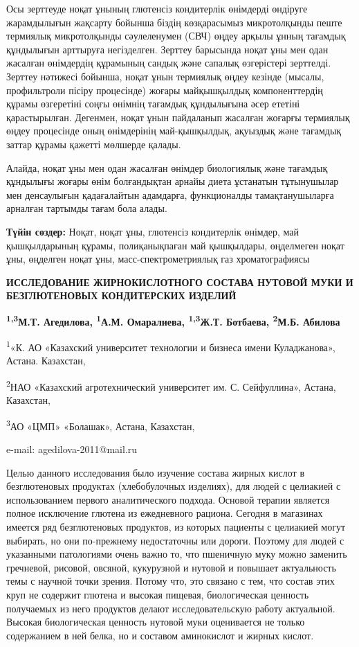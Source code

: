Осы зерттеуде ноқат ұнының глютенсіз кондитерлік өнімдерді өндіруге
жарамдылығын жақсарту бойынша біздің көзқарасымыз микротолқынды пеште
термиялық микротолқынды сәулеленумен (СВЧ) өңдеу арқылы ұнның тағамдық
құндылығын арттыруға негізделген. Зерттеу барысында ноқат ұны мен одан
жасалған өнімдердің құрамының сандық және сапалық өзгерістері зерттелді.
Зерттеу нәтижесі бойынша, ноқат ұнын термиялық өңдеу кезінде (мысалы,
профильтроли пісіру процесінде) жоғары майқышқылдық компоненттердің
құрамы өзгеретіні соңғы өнімнің тағамдық құндылығына әсер ететіні
қарастырылған. Дегенмен, ноқат ұнын пайдаланып жасалған жоғарғы
термиялық өңдеу процесінде оның өнімдерінің май-қышқылдық, ақуыздық және
тағамдық заттар құрамы қажетті мөлшерде қалады.

Алайда, ноқат ұны мен одан жасалған өнімдер биологиялық және тағамдық
құндылығы жоғары өнім болғандықтан арнайы диета ұстанатын тұтынушылар
мен денсаулығын қадағалайтын адамдарға, функционалды тамақтанушыларға
арналған тартымды тағам бола алады.

{\bfseries Түйін сөздер:} Ноқат, ноқат ұны, глютенсіз кондитерлік өнімдер,
май қышқылдарының құрамы, полиқанықпаған май қышқылдары, өңделмеген
ноқат ұны, өңделген ноқат ұны, масс-спектрометриялық газ хроматографиясы
\begin{articleheader}

{\bfseries ИССЛЕДОВАНИЕ ЖИРНОКИСЛОТНОГО СОСТАВА НУТОВОЙ МУКИ И
БЕЗГЛЮТЕНОВЫХ КОНДИТЕРСКИХ ИЗДЕЛИЙ}

{\bfseries \textsuperscript{1,3}М.Т. Агедилова\textsuperscript{\envelope },
\textsuperscript{1}А.М. Омаралиева, \textsuperscript{1,3}Ж.Т. Ботбаева,
\textsuperscript{2}М.Б. Абилова}
\end{articleheader}
\begin{affiliation}
\textsuperscript{1}«К. АО «Казахский университет технологии и бизнеса
имени Куладжанова», Астана. Казахстан,

\textsuperscript{2}НАО «Казахский агротехнический университет им. С.
Сейфуллина», Астана, Казахстан,

\textsuperscript{3}АО «ЦМП» «Болашак», Астана, Казахстан,

e-mail: agedilova-2011@mail.ru
\end{affiliation}

Целью данного исследования было изучение состава жирных кислот в
безглютеновых продуктах (хлебобулочных изделиях), для людей с целиакией
с использованием первого аналитического подхода. Основой терапии
является полное исключение глютена из ежедневного рациона. Сегодня в
магазинах имеется ряд безглютеновых продуктов, из которых пациенты с
целиакией могут выбирать, но они по-прежнему недостаточны или дороги.
Поэтому для людей с указанными патологиями очень важно то, что пшеничную
муку можно заменить гречневой, рисовой, овсяной, кукурузной и нутовой и
повышает актуальность темы с научной точки зрения. Потому что, это
связано с тем, что состав этих круп не содержит глютена и высокая
пищевая, биологическая ценность получаемых из него продуктов делают
исследовательскую работу актуальной. Высокая биологическая ценность
нутовой муки оценивается не только содержанием в ней белка, но и
составом аминокислот и жирных кислот.

